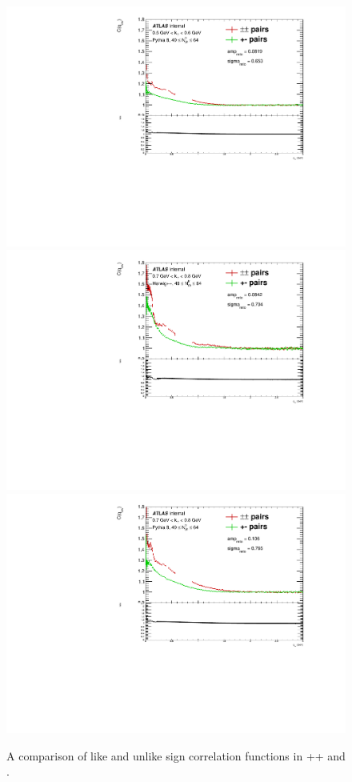 \begin{figure}[t]
\begin{minipage}[t]{1.0\textwidth}
\includegraphics[width=.49\linewidth]{pythia8_bkgd_charge_comp_cent3_kt4.pdf}\\
\includegraphics[width=.49\linewidth]{herwig_bkgd_charge_comp_cent3_kt6.pdf}
\includegraphics[width=.49\linewidth]{pythia8_bkgd_charge_comp_cent3_kt6.pdf}\\
\end{minipage}
\caption{A comparison of like and unlike sign correlation functions in \Herwig++ and \PYEight.}
\label{fig:herwig_pythia8_cent3_bkgd_charge_comp}
\end{figure}

